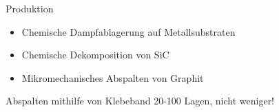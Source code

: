 \documentclass[../defence.tex]{subfiles}
\begin{document}
  \begin{frame}{Produktion}
    \pause
    \begin{itemize}
      \item Chemische Dampfablagerung auf Metallsubstraten
      \item Chemische Dekomposition von SiC
      \item Mikromechanisches Abspalten von Graphit
    \end{itemize}
    \pause
    \begin{block}{Abspalten mithilfe von Klebeband}
      20-100 Lagen, nicht weniger!
    \end{block}
  \end{frame}
\end{document}
